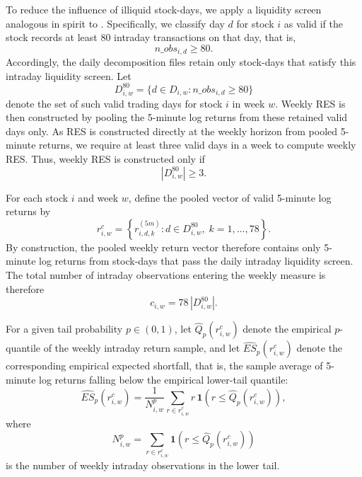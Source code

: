 \documentclass[11pt,a4paper]{article}
\begin{document}
To reduce the influence of illiquid stock-days, we apply a liquidity
screen analogous in spirit to \citet{amaya2015}. Specifically, we
classify day \(d\) for stock \(i\) as valid if the stock records at
least 80 intraday transactions on that day, that is,
\begin{equation}
n\_obs_{i,d}\ge 80.
\label{eq:screen}
\end{equation}
Accordingly, the daily decomposition files retain only stock-days that
satisfy this intraday liquidity screen. Let
\begin{equation}
D^{80}_{i,w}=\{d\in D_{i,w}: n\_obs_{i,d}\ge 80\}
\label{eq:validdays}
\end{equation}
denote the set of such valid trading days for stock \(i\) in week
\(w\). Weekly RES is then constructed by pooling the 5-minute log
returns from these retained valid days only. As RES is constructed
directly at the weekly horizon from pooled 5-minute returns, we require
at least three valid days in a week to compute weekly RES. Thus, weekly
RES is constructed only if
\begin{equation}
|D^{80}_{i,w}|\ge 3.
\label{eq:mindays}
\end{equation}

For each stock \(i\) and week \(w\), define the pooled vector of valid
5-minute log returns by
\begin{equation}
r_{i,w}^{c}
=
\left\{
r_{i,d,k}^{(5m)}: d\in D^{80}_{i,w},\; k=1,\dots,78
\right\}.
\label{eq:pooled}
\end{equation}
By construction, the pooled weekly return vector therefore contains only
5-minute log returns from stock-days that pass the daily intraday
liquidity screen. The total number of intraday observations entering the
weekly measure is therefore
\begin{equation}
c_{i,w}=78\,|D^{80}_{i,w}|.
\label{eq:count}
\end{equation}

For a given tail probability \(p\in(0,1)\), let
\(\widehat{Q}_{p}(r_{i,w}^{c})\) denote the empirical \(p\)-quantile of
the weekly intraday return sample, and let
\(\widehat{ES}_{p}(r_{i,w}^{c})\) denote the corresponding empirical
expected shortfall, that is, the sample average of 5-minute log returns
falling below the empirical lower-tail quantile:
\begin{equation}
\widehat{ES}_{p}(r_{i,w}^{c})
=
\frac{1}{N_{i,w}^{p}}
\sum_{r\in r_{i,w}^{c}}
r\,
\mathbf{1}\!\left(r\le \widehat{Q}_{p}(r_{i,w}^{c})\right),
\label{eq:es}
\end{equation}
where
\begin{equation}
N_{i,w}^{p}
=
\sum_{r\in r_{i,w}^{c}}
\mathbf{1}\!\left(r\le \widehat{Q}_{p}(r_{i,w}^{c})\right)
\label{eq:tailcount}
\end{equation}
is the number of weekly intraday observations in the lower tail.
\end{document}
